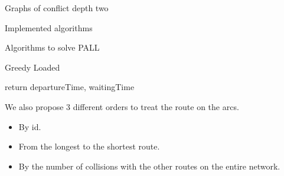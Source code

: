 \documentclass[10pt]{article}
\begin{document}
\begin{section}{Graphs of conflict depth two}
\begin{subsection}{Implemented algorithms}
\begin{subsubsection}{Algorithms to solve PALL}
\begin{paragraph}{Greedy Loaded}
\begin{algorithm}[H]
\begin{algorithmic}
 	\ENDFOR
	\STATE return departureTime, waitingTime

 	\end{algorithmic}
 	\end{algorithm}
We also propose $3$ different orders to treat the route on the arcs. 
\begin{itemize}
\item By id.
\item From the longest to the shortest route.
\item By the number of collisions with the other routes on the entire network.
\end{itemize}
    \end{paragraph}
  \end{subsubsection}
\end{subsection}
\end{section}
	 



\end{document}
